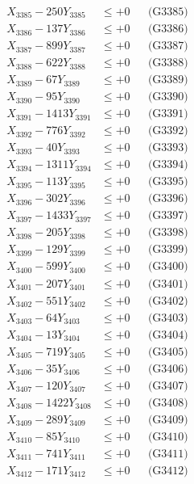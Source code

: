 \documentclass[a4paper,10pt]{article}
\begin{document}
{\begin{align}
X_{3385} - 250Y_{3385} &\leq +0 && \text{(G3385)} \\
X_{3386} - 137Y_{3386} &\leq +0 && \text{(G3386)} \\
X_{3387} - 899Y_{3387} &\leq +0 && \text{(G3387)} \\
X_{3388} - 622Y_{3388} &\leq +0 && \text{(G3388)} \\
X_{3389} - 67Y_{3389} &\leq +0 && \text{(G3389)} \\
X_{3390} - 95Y_{3390} &\leq +0 && \text{(G3390)} \\
\allowbreak
X_{3391} - 1413Y_{3391} &\leq +0 && \text{(G3391)} \\
X_{3392} - 776Y_{3392} &\leq +0 && \text{(G3392)} \\
X_{3393} - 40Y_{3393} &\leq +0 && \text{(G3393)} \\
X_{3394} - 1311Y_{3394} &\leq +0 && \text{(G3394)} \\
X_{3395} - 113Y_{3395} &\leq +0 && \text{(G3395)} \\
X_{3396} - 302Y_{3396} &\leq +0 && \text{(G3396)} \\
X_{3397} - 1433Y_{3397} &\leq +0 && \text{(G3397)} \\
X_{3398} - 205Y_{3398} &\leq +0 && \text{(G3398)} \\
X_{3399} - 129Y_{3399} &\leq +0 && \text{(G3399)} \\
X_{3400} - 599Y_{3400} &\leq +0 && \text{(G3400)} \\
\allowbreak
X_{3401} - 207Y_{3401} &\leq +0 && \text{(G3401)} \\
X_{3402} - 551Y_{3402} &\leq +0 && \text{(G3402)} \\
X_{3403} - 64Y_{3403} &\leq +0 && \text{(G3403)} \\
X_{3404} - 13Y_{3404} &\leq +0 && \text{(G3404)} \\
X_{3405} - 719Y_{3405} &\leq +0 && \text{(G3405)} \\
X_{3406} - 35Y_{3406} &\leq +0 && \text{(G3406)} \\
X_{3407} - 120Y_{3407} &\leq +0 && \text{(G3407)} \\
X_{3408} - 1422Y_{3408} &\leq +0 && \text{(G3408)} \\
X_{3409} - 289Y_{3409} &\leq +0 && \text{(G3409)} \\
X_{3410} - 85Y_{3410} &\leq +0 && \text{(G3410)} \\
\allowbreak
X_{3411} - 741Y_{3411} &\leq +0 && \text{(G3411)} \\
X_{3412} - 171Y_{3412} &\leq +0 && \text{(G3412)} \\

\end{align}}
\end{document}
